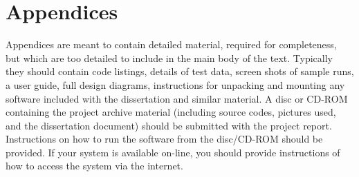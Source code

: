 \documentclass[a4paper,10.5pt]{article}
\begin{document}
\section{Appendices}
Appendices are meant to contain detailed material, required for completeness, but which are too detailed to include in the main body of the text. Typically they should contain code listings, details of test data, screen shots of sample runs, a user guide, full design diagrams, instructions for unpacking and mounting any software included with the dissertation and similar material. A disc or CD-ROM containing the project archive material (including source codes, pictures used, and the dissertation document) should be submitted with the project report. Instructions on how to run the software from the disc/CD-ROM should be provided. If your system is available on-line, you should provide instructions of how to access the system via the internet.
\end{document}
